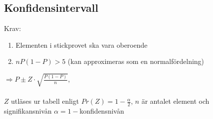 \documentclass[a4paper,10pt]{article}
\begin{document}
\subsection*{Konfidensintervall}
Krav:
\begin{enumerate}
  \item{Elementen i stickprovet ska vara oberoende}
  \item{$nP(1-P) > 5$ (kan approximeras som en normalfördelning)}
\end{enumerate}
$\Rightarrow P \pm Z \cdot \sqrt{\frac{P(1-P)}{n}}$, \\
\, \\
$Z$ utläses ur tabell enligt $Pr(Z) = 1 - \frac{\alpha}{2}$, $n$ är antalet element och \\
signifikansnivån $\alpha = 1-$konfidensnivån




\end{document}
